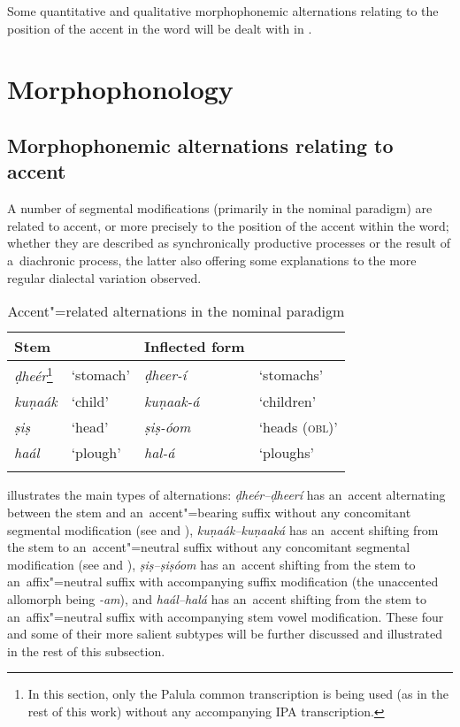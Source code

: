 Some quantitative and qualitative morphophonemic alternations relating to the position of the accent in the word will be dealt with in .


\section{Morphophonology}
\label{sec:3-5}

\subsection{Morphophonemic alternations relating to accent}
\label{subsec:3-5-1}

A number of segmental modifications (primarily in the nominal paradigm) are related to accent, or more precisely to the position of the accent within the word; whether they are described as synchronically productive processes or the result of a~diachronic process, the latter also offering some explanations to the more regular dialectal variation observed. 


\begin{table}[ht]
\caption{ Accent"=related alternations in the nominal paradigm}
\begin{tabularx}{\textwidth}{ l@{\hspace{30pt}} Q Q Q }
\lsptoprule
Stem &
&
Inflected form &
\\\hline
\textit{ḍheér}\footnote{In this section, only the Palula common transcription is being used (as in the rest of this work) without any accompanying IPA transcription.} &
`stomach' &
\textit{ḍheer-í} &
`stomachs'\\
\textit{kuṇaák} &
`child' &
\textit{kuṇaak-á} &
`children'\\
\textit{ṣiṣ} &
`head' &
\textit{ṣiṣ-óom} &
`heads (\textsc{obl)}'\\
\textit{haál} &
`plough' &
\textit{hal-á} &
`ploughs'\\\lspbottomrule
\end{tabularx}
\label{tab:3-7}
\end{table}


 illustrates the main types of alternations: \textit{ḍheér--ḍheerí} has an~accent alternating between the stem and an~accent"=bearing suffix without any concomitant segmental modification (see  and ), \textit{kuṇaák--kuṇaaká} has an~accent shifting from the stem to an~accent"=neutral suffix without any concomitant segmental modification (see  and ), \textit{ṣiṣ--ṣiṣóom} has an~accent shifting from the stem to an~affix"=neutral suffix with accompanying suffix modification (the unaccented allomorph being \textit{-am}), and \textit{haál--halá} has an~accent shifting from the stem to an~affix"=neutral suffix with accompanying stem vowel modification. These four and some of their more salient subtypes will be further discussed and illustrated in the rest of this subsection.


